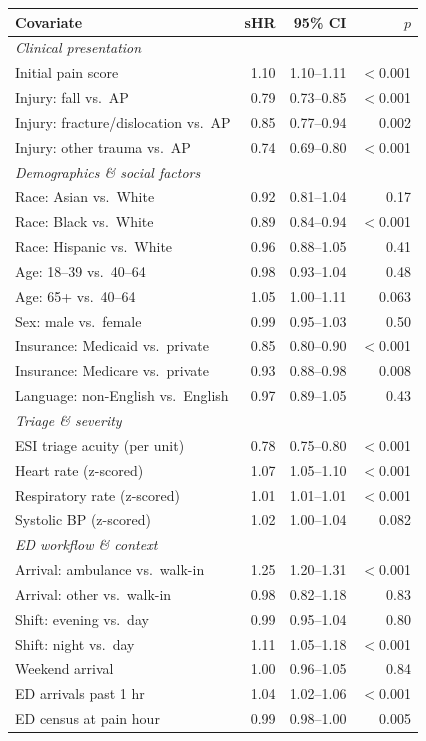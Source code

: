 \begin{tabular}{lrrr}
\toprule
Covariate & sHR & 95\% CI & $p$ \\
\midrule
\multicolumn{4}{l}{\textit{Clinical presentation}} \\
Initial pain score & 1.10 & 1.10--1.11 & $<$0.001 \\
Injury: fall vs.\ AP & 0.79 & 0.73--0.85 & $<$0.001 \\
Injury: fracture/dislocation vs.\ AP & 0.85 & 0.77--0.94 & 0.002 \\
Injury: other trauma vs.\ AP & 0.74 & 0.69--0.80 & $<$0.001 \\
\midrule
\multicolumn{4}{l}{\textit{Demographics \& social factors}} \\
Race: Asian vs.\ White & 0.92 & 0.81--1.04 & 0.17 \\
Race: Black vs.\ White & 0.89 & 0.84--0.94 & $<$0.001 \\
Race: Hispanic vs.\ White & 0.96 & 0.88--1.05 & 0.41 \\
Age: 18--39 vs.\ 40--64 & 0.98 & 0.93--1.04 & 0.48 \\
Age: 65+ vs.\ 40--64 & 1.05 & 1.00--1.11 & 0.063 \\
Sex: male vs.\ female & 0.99 & 0.95--1.03 & 0.50 \\
Insurance: Medicaid vs.\ private & 0.85 & 0.80--0.90 & $<$0.001 \\
Insurance: Medicare vs.\ private & 0.93 & 0.88--0.98 & 0.008 \\
Language: non-English vs.\ English & 0.97 & 0.89--1.05 & 0.43 \\
\midrule
\multicolumn{4}{l}{\textit{Triage \& severity}} \\
ESI triage acuity (per unit) & 0.78 & 0.75--0.80 & $<$0.001 \\
Heart rate (z-scored) & 1.07 & 1.05--1.10 & $<$0.001 \\
Respiratory rate (z-scored) & 1.01 & 1.01--1.01 & $<$0.001 \\
Systolic BP (z-scored) & 1.02 & 1.00--1.04 & 0.082 \\
\midrule
\multicolumn{4}{l}{\textit{ED workflow \& context}} \\
Arrival: ambulance vs.\ walk-in & 1.25 & 1.20--1.31 & $<$0.001 \\
Arrival: other vs.\ walk-in & 0.98 & 0.82--1.18 & 0.83 \\
Shift: evening vs.\ day & 0.99 & 0.95--1.04 & 0.80 \\
Shift: night vs.\ day & 1.11 & 1.05--1.18 & $<$0.001 \\
Weekend arrival & 1.00 & 0.96--1.05 & 0.84 \\
ED arrivals past 1 hr & 1.04 & 1.02--1.06 & $<$0.001 \\
ED census at pain hour & 0.99 & 0.98--1.00 & 0.005 \\
\bottomrule
\end{tabular}
